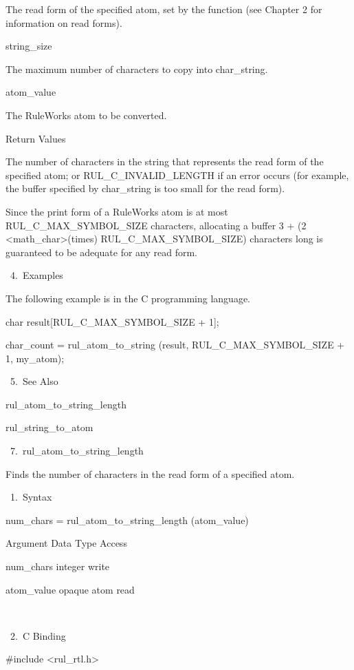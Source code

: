           The read form of the specified atom,
          set by the function (see Chapter 2
          for information on read forms).

          string_size

          The maximum number of characters to
          copy into char_string.

          atom_value

          The RuleWorks atom to be converted.

          Return Values

          The number of characters in the
          string that represents the read form
          of the specified atom; or
          RUL_C_INVALID_LENGTH if an error
          occurs (for example, the buffer
          specified by char_string is too
          small for the read form).

          Since the print form of a RuleWorks
          atom is at most
          RUL_C_MAX_SYMBOL_SIZE characters,
          allocating a buffer 3 + (2
          <math_char>(times)
          RUL_C_MAX_SYMBOL_SIZE) characters
          long is guaranteed to be adequate
          for any read form.

       4. Examples

          The following example is in the C
          programming language.

          char result[RUL_C_MAX_SYMBOL_SIZE +
          1];

          char_count = rul_atom_to_string
          (result, RUL_C_MAX_SYMBOL_SIZE + 1,
          my_atom);

       5. See Also

    rul_atom_to_string_length

    rul_string_to_atom

 7. rul_atom_to_string_length

    Finds the number of characters in the read
    form of a specified atom.

       1. Syntax

          num_chars =
          rul_atom_to_string_length
          (atom_value)

          Argument  Data Type    Access

          num_chars  integer    write

          atom_value  opaque atom   read

           

       2. C Binding

          #include <rul_rtl.h>


